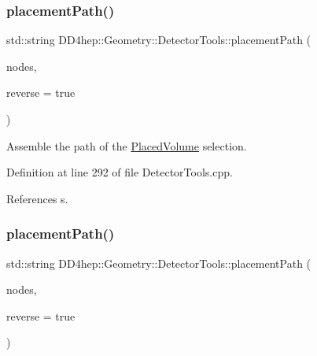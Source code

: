 \hypertarget{namespace_d_d4hep_1_1_geometry_1_1_detector_tools_a792502fe2b1afaa030b9697151824452}{}\label{namespace_d_d4hep_1_1_geometry_1_1_detector_tools_a792502fe2b1afaa030b9697151824452} 
\subsubsection{\texorpdfstring{placement\+Path()}{placementPath()}\hspace{0.1cm}{\footnotesize\ttfamily [2/5]}}
{\footnotesize\ttfamily std\+::string D\+D4hep\+::\+Geometry\+::\+Detector\+Tools\+::placement\+Path (\begin{DoxyParamCaption}\item[{const \hyperlink{namespace_d_d4hep_1_1_geometry_1_1_detector_tools_a6cc33285199e04dd336a33e6e62925e6}{Placement\+Path} \&}]{nodes,  }\item[{bool}]{reverse = {\ttfamily true} }\end{DoxyParamCaption})}



Assemble the path of the \hyperlink{class_d_d4hep_1_1_geometry_1_1_placed_volume}{Placed\+Volume} selection. 



Definition at line 292 of file Detector\+Tools.\+cpp.



References s.

\hypertarget{namespace_d_d4hep_1_1_geometry_1_1_detector_tools_a766410c432f7324f634be04ec0b16857}{}\label{namespace_d_d4hep_1_1_geometry_1_1_detector_tools_a766410c432f7324f634be04ec0b16857} 
\subsubsection{\texorpdfstring{placement\+Path()}{placementPath()}\hspace{0.1cm}{\footnotesize\ttfamily [3/5]}}
{\footnotesize\ttfamily std\+::string D\+D4hep\+::\+Geometry\+::\+Detector\+Tools\+::placement\+Path (\begin{DoxyParamCaption}\item[{const std\+::vector$<$ const T\+Geo\+Node $\ast$$>$ \&}]{nodes,  }\item[{bool}]{reverse = {\ttfamily true} }\end{DoxyParamCaption})}



